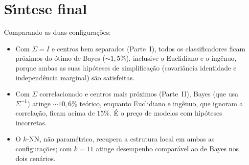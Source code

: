 ﻿\documentclass[12pt,a4paper]{article}
\begin{document}
\FloatBarrier
\section*{S\'\i ntese final}

Comparando as duas configura\c{c}\~oes:
\begin{itemize}
\item Com $\Sigma=I$ e centros bem separados (Parte~I), todos os
classificadores ficam pr\'oximos do \'otimo de Bayes ($\sim 1{,}5\%$),
inclusive o Euclidiano e o ing\^enuo, porque ambas as suas hip\'oteses
de simplifica\c{c}\~ao (covari\^ancia identidade e independ\^encia
marginal) s\~ao satisfeitas.
\item Com $\Sigma$ correlacionado e centros mais pr\'oximos
(Parte~II), Bayes (que usa $\Sigma^{-1}$) atinge $\sim 10{,}6\%$
te\'orico, enquanto Euclidiano e ing\^enuo, que ignoram a
correla\c{c}\~ao, ficam acima de $15\%$. \'E o pre\c{c}o de modelos com
hip\'oteses incorretas.
\item O $k$-NN, n\~ao param\'etrico, recupera a estrutura local em
ambas as configura\c{c}\~oes; com $k=11$ atinge desempenho
compar\'avel ao de Bayes nos dois cen\'arios.
\end{itemize}
\end{document}
